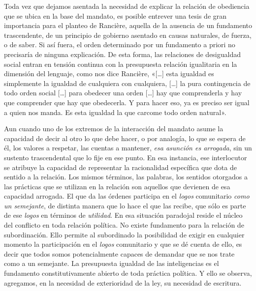 Toda vez que dejamos asentada la necesidad de explicar la relación de obediencia que se ubica en la base del mandato, es posible entrever una tesis de gran importancia para el planteo de Rancière, aquella de la ausencia de un fundamento trascendente, de un principio de gobierno asentado en causas naturales, de fuerza, o de saber. Si así fuera, el orden determinado por un fundamento a priori no precisaría de ninguna explicación. De esta forma, las relaciones de desigualdad social entran en tensión continua con la presupuesta relación igualitaria en la dimensión del lenguaje, como nos dice Rancière, «{[}\ldots{]} esta igualdad es simplemente la igualdad de cualquiera con cualquiera, {[}\ldots{]} la pura contingencia de todo orden social {[}\ldots{]} para obedecer una orden {[}\ldots{]} hay que comprenderla y hay que comprender que hay que obedecerla. Y para hacer eso, ya es preciso ser igual a quien nos manda. Es esta igualdad la que carcome todo orden natural».

Aun cuando uno de los extremos de la interacción del mandato asume la capacidad de decir al otro lo que debe hacer, o por analogía, lo que se espera de él, los valores a respetar, las cuentas a mantener, \emph{esa asunción es arrogada}, sin un sustento trascendental que lo fije en ese punto. En esa instancia, ese interlocutor se atribuye la capacidad de representar la racionalidad específica que dota de sentido a la relación. Los mismos términos, las palabras, los sentidos otorgados a las prácticas que se utilizan en la relación son aquellos que devienen de esa capacidad arrogada. El que da las órdenes participa en el \emph{logos} comunitario \emph{como un semejante}, de distinta manera que lo hace el que las recibe, que sólo es parte de ese \emph{logos} en términos de \emph{utilidad}. En esa situación paradojal reside el núcleo del conflicto en toda relación política. No existe fundamento para la relación de subordinación. Ello permite al subordinado la posibilidad de exigir en cualquier momento la participación en el \emph{logos} comunitario y que se dé cuenta de ello, es decir que todos somos potencialmente capaces de demandar que se nos trate como a un semejante. La presupuesta igualdad de las inteligencias es el fundamento constitutivamente abierto de toda práctica política. Y ello se observa, agregamos, en la necesidad de exterioridad de la ley, su necesidad de escritura.

